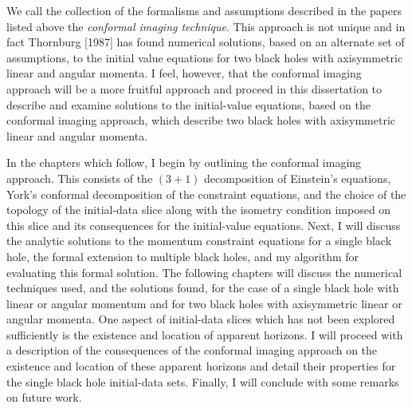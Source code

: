 We call the collection of the formalisms and assumptions described in the papers
listed above the {\it conformal imaging technique}.  This approach is not unique
and in fact Thornburg [1987] has found numerical solutions, based on an alternate
set of assumptions, to the initial value equations for two black holes with
axisymmetric linear and angular momenta.  I feel, however, that the conformal
imaging approach will be a more fruitful approach and proceed in this
dissertation to describe and examine solutions to the initial-value equations,
based on the conformal imaging approach, which describe two black holes with
axisymmetric linear and angular momenta.

In the chapters which follow, I begin by outlining the conformal imaging
approach.  This consists of the $(3+1)$ decomposition of Einstein's equations,
York's conformal decomposition of the constraint equations, and the choice of
the topology of the initial-data slice along with the isometry condition imposed
on this slice and its consequences for the initial-value equations.  Next, I
will discuss the analytic solutions to the momentum constraint equations for a
single black hole, the formal extension to multiple black holes, and my
algorithm for evaluating this formal solution.  The following chapters will
discuss the numerical techniques used, and the solutions found, for the case of
a single black hole with linear or angular momentum and for two black holes with
axisymmetric linear or angular momenta.  One aspect of initial-data slices
which has not been explored sufficiently is the existence and location of
apparent horizons.  I will proceed with a description of the consequences of the
conformal imaging approach on the existence and location of these apparent
horizons and detail their properties for the single black hole initial-data
sets.  Finally, I will conclude with some remarks on future work.

\vfill
\eject
